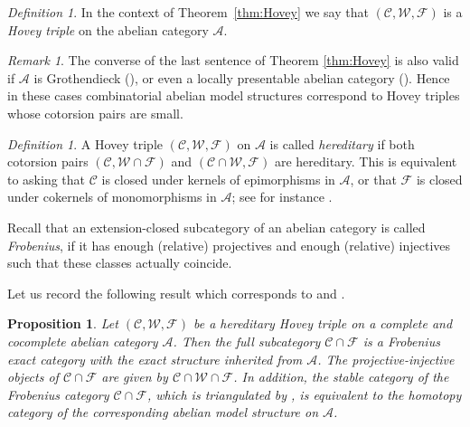 \documentclass{amsart}
\newcommand{\GD}[1]{{\color{ForestGreen} G: [#1]}}
\def \A{{\mathcal A}}
\def \C{{\mathcal C}}
\def \F{{\mathcal F}}
\def \W{{\mathcal W}}
\numberwithin{equation}{section}%
\newtheorem{proposition}[equation]{Proposition}
\theoremstyle{remark}
\newtheorem{definition}[equation]{Definition}
\newtheorem{remark}[equation]{Remark}
\begin{document}
\begin{definition}
\label{def:hovey_triple}
In the context of Theorem~\ref{thm:Hovey} we say that $(\C,\W,\F)$ is a \textit{Hovey triple} on the abelian category $\A$.
\end{definition}



\begin{remark}
The converse of the last sentence of Theorem \ref{thm:Hovey} is also valid if $\A$ is Grothendieck (\cite[Proposition~1.2.7]{Bec14}), or even a locally presentable abelian category (\cite[Lemma~3.7]{PoSt22}). Hence in these cases combinatorial abelian model structures correspond to Hovey triples whose cotorsion pairs are small.
\end{remark}


\begin{definition}
    A Hovey triple $(\C,\W,\F)$ on $\A$ is called \textit{hereditary} if both cotorsion pairs $(\C,\W\cap \F)$ and $(\C\cap \W,\F)$ are hereditary. This is equivalent to asking that $\C$ is closed under kernels of epimorphisms  in $\A$, or that $\F$ is closed under cokernels of monomorphisms in $\A$; see for instance \cite[Corollary~1.1.12]{Bec14}.
\end{definition}

Recall that an extension-closed subcategory of an abelian category is called \textit{Frobenius}, if it has enough (relative) projectives and enough (relative) injectives such that these classes actually coincide.

Let us record the following result which corresponds to \cite[Proposition 5.2]{Gil11} { and }\cite[Theorem~2.6]{Gil_survey}.

\begin{proposition}
\label{prop:her_cat}
{Let $(\C,\W,\F)$ be a hereditary Hovey triple on a complete and cocomplete abelian category $\A$.} 
Then the full subcategory $\C\cap \F$ is a Frobenius exact category with the exact structure inherited from $\A$. The  projective-injective objects of $\C\cap\F$ are given by $\C\cap\W\cap\F$. { In addition}, the stable category of the Frobenius category $\C\cap\F$, which is triangulated by \cite{Happel}, is equivalent to the homotopy category of the corresponding abelian model structure on $\A$. 
\end{proposition}
\end{document}
